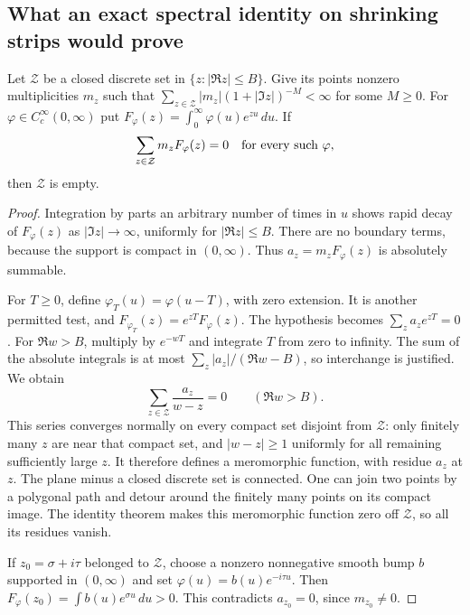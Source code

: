 \subsection{What an exact spectral identity on shrinking strips would prove}
\begin{srlemma}
\label{lem:sr-spectrum-unique}
Let \(\mathcal Z\) be a closed discrete set in
\(\{z:|\Re z|\leq B\}\).
Give its points nonzero multiplicities \(m_z\) such that
\(\sum_{z\in\mathcal Z}|m_z|(1+|\Im z|)^{-M}<\infty\)
for some \(M\geq0\).
For \(\varphi\in C_c^\infty(0,\infty)\) put
\(F_\varphi(z)=\int_0^\infty\varphi(u)e^{zu}\,du\).
If
\[
 \sum_{z\in\mathcal Z}m_zF_\varphi(z)=0
       \quad\hbox{for every such }\varphi,
\]
then \(\mathcal Z\) is empty.
\end{srlemma}
\begin{proof}
Integration by parts an arbitrary number of times in \(u\)
shows rapid decay of \(F_\varphi(z)\) as \(|\Im z|\to\infty\),
uniformly for \(|\Re z|\leq B\).
There are no boundary terms, because the support is compact in
\((0,\infty)\). Thus
\(a_z=m_zF_\varphi(z)\) is absolutely summable.

For \(T\geq0\), define
\(\varphi_T(u)=\varphi(u-T)\), with zero extension.
It is another permitted test, and
\(F_{\varphi_T}(z)=e^{zT}F_\varphi(z)\).
The hypothesis becomes \(\sum_z a_ze^{zT}=0\).
For \(\Re w>B\), multiply by \(e^{-wT}\) and integrate \(T\)
from zero to infinity. The sum of the absolute integrals is at
most \(\sum_z|a_z|/(\Re w-B)\), so interchange is justified.
We obtain
\[
 \sum_{z\in\mathcal Z}\frac{a_z}{w-z}=0\qquad(\Re w>B).
\]
This series converges normally on every compact set disjoint from
\(\mathcal Z\): only finitely many \(z\) are near that compact set,
and \(|w-z|\geq1\) uniformly for all remaining sufficiently large
\(z\). It therefore defines a meromorphic function, with residue
\(a_z\) at \(z\).
The plane minus a closed discrete set is connected. One can join
two points by a polygonal path and detour around the finitely many
points on its compact image.
The identity theorem makes this meromorphic function zero off
\(\mathcal Z\), so all its residues vanish.

If \(z_0=\sigma+i\tau\) belonged to \(\mathcal Z\), choose a nonzero
nonnegative smooth bump \(b\) supported in \((0,\infty)\) and set
\(\varphi(u)=b(u)e^{-i\tau u}\).
Then \(F_\varphi(z_0)=\int b(u)e^{\sigma u}\,du>0\).
This contradicts \(a_{z_0}=0\), since \(m_{z_0}\ne0\).
\end{proof}


